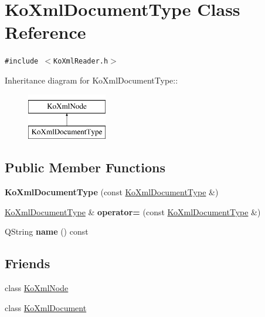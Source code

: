 \hypertarget{classKoXmlDocumentType}{
\section{KoXmlDocumentType Class Reference}
\label{classKoXmlDocumentType}
}
{\tt \#include $<$KoXmlReader.h$>$}

Inheritance diagram for KoXmlDocumentType::\begin{figure}[H]
\begin{center}
\leavevmode
\includegraphics[height=2cm]{classKoXmlDocumentType}
\end{center}
\end{figure}
\subsection*{Public Member Functions}
\begin{CompactItemize}
\item 
\hypertarget{classKoXmlDocumentType_8fab4dbc84e6de8408ae05043525740a}{
\textbf{KoXmlDocumentType} (const \hyperlink{classKoXmlDocumentType}{KoXmlDocumentType} \&)}
\label{classKoXmlDocumentType_8fab4dbc84e6de8408ae05043525740a}

\item 
\hypertarget{classKoXmlDocumentType_b013c4a30060086de2797764414ca95c}{
\hyperlink{classKoXmlDocumentType}{KoXmlDocumentType} \& \textbf{operator=} (const \hyperlink{classKoXmlDocumentType}{KoXmlDocumentType} \&)}
\label{classKoXmlDocumentType_b013c4a30060086de2797764414ca95c}

\item 
\hypertarget{classKoXmlDocumentType_a383d3090676752ae75bf24325a44003}{
QString \textbf{name} () const }
\label{classKoXmlDocumentType_a383d3090676752ae75bf24325a44003}

\end{CompactItemize}
\subsection*{Friends}
\begin{CompactItemize}
\item 
\hypertarget{classKoXmlDocumentType_6c97883f92c7cbf2ecdf17db6cea8297}{
class \hyperlink{classKoXmlDocumentType_6c97883f92c7cbf2ecdf17db6cea8297}{KoXmlNode}}
\label{classKoXmlDocumentType_6c97883f92c7cbf2ecdf17db6cea8297}

\item 
\hypertarget{classKoXmlDocumentType_7f0a67ef52ddc6542737225a82e4f487}{
class \hyperlink{classKoXmlDocumentType_7f0a67ef52ddc6542737225a82e4f487}{KoXmlDocument}}
\label{classKoXmlDocumentType_7f0a67ef52ddc6542737225a82e4f487}

\end{CompactItemize}


